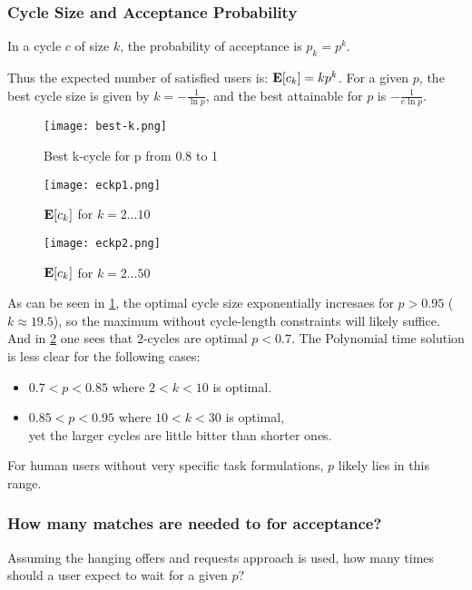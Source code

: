 \documentclass[main.tex]{subfiles}
\begin{document}
\subsubsection{Cycle Size and Acceptance Probability}

In a cycle $c$ of size $k$, the probability of acceptance is $p_k = p^k$.

Thus the expected number of satisfied users is: $\mathbf{E}[c_k] = k p^k$. For a given $p$, the best cycle size is given by $k = -\frac{1}{\ln p}$, and the best attainable for $p$ is $-\frac{1}{e \ln p}$.

\begin{figure}
  \texttt{[image: best-k.png]}
  \caption{Best k-cycle for p from 0.8 to 1}
  \label{best-k}
\end{figure}

\begin{figure}
  \texttt{[image: eckp1.png]}
  \caption{$\mathbf{E}[c_k]$ for $k = 2 \dots 10$}
  \label{eckp1}
\end{figure}

\begin{figure}
  \texttt{[image: eckp2.png]}
  \caption{$\mathbf{E}[c_k]$ for $k = 2 \dots 50$}
  \label{eckp2}
\end{figure}

As can be seen in \ref{best-k}, the optimal cycle size exponentially incresaes for $p > 0.95$ ($k \approx 19.5$), so the maximum without cycle-length constraints will likely suffice. And in \ref{eckp1} one sees that $2$-cycles are optimal $p < 0.7$. The Polynomial time solution is less clear for the following cases:
\begin{itemize}
  \item $0.7 < p < 0.85$ where $ 2 < k < 10$ is optimal.
  \item $0.85 < p < 0.95$ where $ 10 < k < 30$ is optimal,
      \\yet the larger cycles are little bitter than shorter ones.
\end{itemize}

For human users without very specific task formulations, $p$ likely lies in this range.

\subsubsection{How many matches are needed to for acceptance?}
Assuming the hanging offers and requests approach is used, how many times should a user expect to wait for a given $p$?
\end{document}
